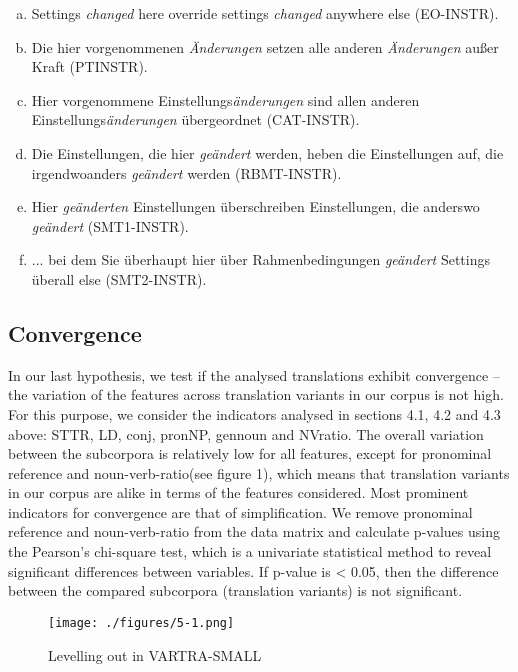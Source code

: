 \documentclass[output=paper]{LSP/langsci}
\begin{document}
\begin{enumerate}[a)]
\item Settings \textit{changed} here override settings \textit{changed} anywhere else (EO-INSTR).
\item Die hier vorgenommenen \textit{Änderungen} setzen alle anderen \textit{Änderungen} außer Kraft (PTINSTR).
\item Hier vorgenommene Einstellungs\textit{änderungen} sind allen anderen Einstellungs\textit{änderungen} übergeordnet (CAT-INSTR).
\item Die Einstellungen, die hier \textit{geändert} werden, heben die Einstellungen auf, die irgendwoanders \textit{geändert} werden (RBMT-INSTR).
\item Hier \textit{geänderten} Einstellungen überschreiben Einstellungen, die anderswo \textit{geändert} (SMT1-INSTR).
\item ... bei dem Sie überhaupt hier über Rahmenbedingungen \textit{geändert} Settings überall else (SMT2-INSTR).
\end{enumerate}

\subsection{Convergence}

In our last hypothesis, we test if the analysed translations exhibit convergence – the variation of the features across translation variants in our corpus is not high. For this purpose, we consider the indicators analysed in sections 4.1, 4.2 and 4.3 above: STTR, LD, conj, pronNP, gennoun and NVratio. The overall variation between the subcorpora is relatively low for all features, except for pronominal reference and noun-verb-ratio(see figure 1), which means that translation variants in our corpus are alike in terms of the features considered.  Most prominent indicators for convergence are that of simplification.  We remove pronominal reference and noun-verb-ratio from the data matrix and calculate p-values using the Pearson’s chi-square test, which is a univariate statistical method to reveal significant differences between variables. If p-value is < 0.05, then the difference between the compared subcorpora (translation variants) is not significant.

\begin{figure}
\texttt{[image: ./figures/5-1.png]}
\caption{Levelling out in VARTRA-SMALL}
\end{figure} 
\end{document}
